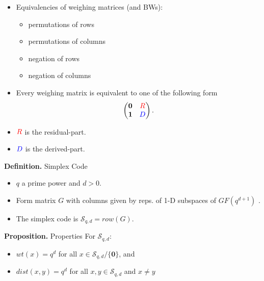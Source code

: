 \documentclass{beamer}
\newcommand{\RR}[1]{\textcolor{red}{#1}}
\newcommand{\BB}[1]{\textcolor{blue}{#1}}
\begin{document}
\begin{frame}

  \begin{itemize}
  \item Equivalencies of weighing matrices (and BWs):
    \begin{itemize}
    \item permutations of rows
    \item permutations of columns
    \item negation of rows
    \item negation of columns
    \end{itemize}
  \item Every weighing matrix is equivalent to one of the following form
    \[
      \begin{pmatrix}
        \textbf{0} & \RR{R} \\
        \textbf{1} & \BB{D}
      \end{pmatrix}.
    \]
  \item $\RR{R}$ is the residual-part.
  \item $\BB{D}$ is the derived-part.
  \end{itemize}
  
\end{frame}

\begin{frame}

  \begin{block}{{\bf Definition.} Simplex Code}
    \begin{itemize}
    \item $q$ a prime power and $d>0$.
    \item Form matrix $G$ with columns given by reps. of 1-D subspaces of
      $GF(q^{d+1})$ .
    \item The simplex code is $\mathcal{S}_{q,d}=row(G)$.
    \end{itemize}
  \end{block}

  \begin{block}{{\bf Proposition.} Properties}
    For $\mathcal{S}_{q,d}$:
    \begin{itemize}
    \item $wt(x) = q^d$ for all $x \in \mathcal{S}_{q,d} / \{\mathbf{0}\}$, and
    \item $dist(x,y)=q^d$ for all $x,y \in \mathcal{S}_{q,d}$ and $x \neq y$
    \end{itemize}
  \end{block}
  
\end{frame}
\end{document}

